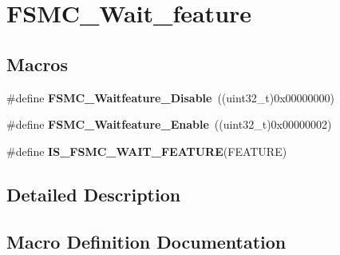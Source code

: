 \hypertarget{group___f_s_m_c___wait__feature}{}\section{F\+S\+M\+C\+\_\+\+Wait\+\_\+feature}
\label{group___f_s_m_c___wait__feature}
\subsection*{Macros}
\begin{DoxyCompactItemize}
\item 
\hypertarget{group___f_s_m_c___wait__feature_ga8a31f05576e66546fbbcdb06ff67da7d}{}\#define {\bfseries F\+S\+M\+C\+\_\+\+Waitfeature\+\_\+\+Disable}~((uint32\+\_\+t)0x00000000)\label{group___f_s_m_c___wait__feature_ga8a31f05576e66546fbbcdb06ff67da7d}

\item 
\hypertarget{group___f_s_m_c___wait__feature_ga3113366130dfbf6d116f1afb94af1726}{}\#define {\bfseries F\+S\+M\+C\+\_\+\+Waitfeature\+\_\+\+Enable}~((uint32\+\_\+t)0x00000002)\label{group___f_s_m_c___wait__feature_ga3113366130dfbf6d116f1afb94af1726}

\item 
\#define {\bfseries I\+S\+\_\+\+F\+S\+M\+C\+\_\+\+W\+A\+I\+T\+\_\+\+F\+E\+A\+T\+U\+R\+E}(F\+E\+A\+T\+U\+R\+E)
\end{DoxyCompactItemize}


\subsection{Detailed Description}


\subsection{Macro Definition Documentation}
\hypertarget{group___f_s_m_c___wait__feature_ga07c2585b517df2c7afbe3ba16c22f236}{}
